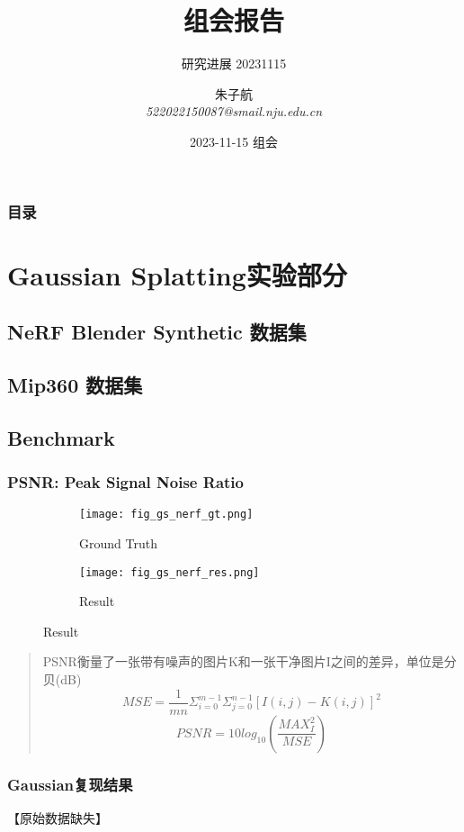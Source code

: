 \documentclass{njupre/njupre}
\title[组会]{组会报告}
\subtitle{研究进展 20231115}
\author[朱子航]{\texorpdfstring{朱子航 \\ \smallskip \textit{522022150087@smail.nju.edu.cn}}{}}
\date[2023-11-15]{\texorpdfstring{2023-11-15 组会}{}}
\begin{document}
\begin{frame}
    \titlepage
\end{frame}
\begin{frame}
    \frametitle{目录}
    \tableofcontents
\end{frame}
\section{Gaussian Splatting实验部分}

\subsection{NeRF Blender Synthetic 数据集}

\subsection{Mip360 数据集}


\subsection{Benchmark}
\begin{frame}
\frametitle{PSNR: Peak Signal Noise Ratio}

\begin{figure}
    \centering
    \begin{subfigure}{0.25\linewidth}
        \texttt{[image: fig\_gs\_nerf\_gt.png]}
        \caption{Ground Truth}
    \end{subfigure}
    \begin{subfigure}{0.25\linewidth}
        \texttt{[image: fig\_gs\_nerf\_res.png]}
        \caption{Result}
    \end{subfigure}
\end{figure}

\begin{quote}
    PSNR衡量了一张带有噪声的图片K和一张干净图片I之间的差异，单位是分贝(dB)
    $$MSE = \frac{1}{mn}\Sigma_{i=0}^{m-1}\Sigma_{j=0}^{n-1}[I(i,j) - K(i,j)]^2$$
    $$PSNR = 10 log_{10}(\frac{MAX_I^2}{MSE})$$ 
\end{quote}

\end{frame}

\begin{frame}
\frametitle{Gaussian复现结果}
【原始数据缺失】
\end{frame}
\end{document}
